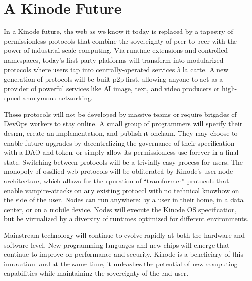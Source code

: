 \documentclass[runningheads]{llncs}
\begin{document}
\section{A Kinode Future}
\label{sec:future}

In a Kinode future, the web as we know it today is replaced by a tapestry of permissionless protocols that combine the sovereignty of peer-to-peer with the power of industrial-scale computing.
Via runtime extensions and controlled namespaces, today's first-party platforms will transform into modularized protocols where users tap into centrally-operated services à la carte.
A new generation of protocols will be built p2p-first, allowing anyone to act as a provider of powerful services like AI image, text, and video producers or high-speed anonymous networking.

These protocols will not be developed by massive teams or require brigades of DevOps workers to stay online.
A small group of programmers will specify their design, create an implementation, and publish it onchain.
They may choose to enable future upgrades by decentralizing the governance of their specification with a DAO and token, or simply allow its permissionless use forever in a final state.
Switching between protocols will be a trivially easy process for users.
The monopoly of ossified web protocols will be obliterated by Kinode's user-node architecture, which allows for the operation of ``transformer'' protocols that enable vampire-attacks on any existing protocol with no technical knowhow on the side of the user.
Nodes can run anywhere: by a user in their home, in a data center, or on a mobile device.
Nodes will execute the Kinode OS specification, but be virtualized by a diversity of runtimes optimized for different environments.

Mainstream technology will continue to evolve rapidly at both the hardware and software level. New programming languages and new chips will emerge that continue to improve on performance and security.
Kinode is a beneficiary of this innovation, and at the same time, it unleashes the potential of new computing capabilities while maintaining the sovereignty of the end user.
\end{document}
